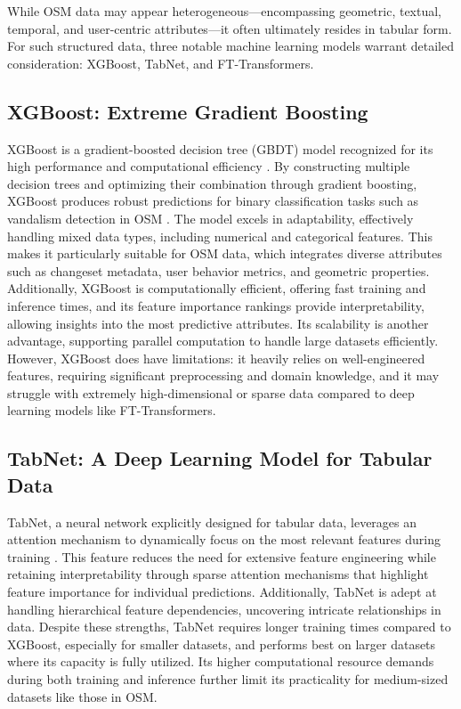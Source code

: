 \documentclass[
    13pt, %
    a4paper, %
    DIV14, %
    listof=totoc, %
    bibliography=totoc, %
    index=totoc, %
    headsepline
]{scrreprt}
\begin{document}
While OSM data may appear heterogeneous—encompassing geometric, textual, temporal, and user-centric attributes—it often ultimately resides in tabular form. For such structured data, three notable machine learning models warrant detailed consideration: XGBoost, TabNet, and FT-Transformers.

\subsection{XGBoost: Extreme Gradient Boosting}
XGBoost is a gradient-boosted decision tree (GBDT) model recognized for its high performance and computational efficiency \cite{xgboost_paper}. By constructing multiple decision trees and optimizing their combination through gradient boosting, XGBoost produces robust predictions for binary classification tasks such as vandalism detection in OSM \cite{Chen2016}. The model excels in adaptability, effectively handling mixed data types, including numerical and categorical features. This makes it particularly suitable for OSM data, which integrates diverse attributes such as changeset metadata, user behavior metrics, and geometric properties. Additionally, XGBoost is computationally efficient, offering fast training and inference times, and its feature importance rankings provide interpretability, allowing insights into the most predictive attributes. Its scalability is another advantage, supporting parallel computation to handle large datasets efficiently. However, XGBoost does have limitations: it heavily relies on well-engineered features, requiring significant preprocessing and domain knowledge, and it may struggle with extremely high-dimensional or sparse data compared to deep learning models like FT-Transformers.

\subsection{TabNet: A Deep Learning Model for Tabular Data}
TabNet, a neural network explicitly designed for tabular data, leverages an attention mechanism to dynamically focus on the most relevant features during training \cite{Arik2021}. This feature reduces the need for extensive feature engineering while retaining interpretability through sparse attention mechanisms that highlight feature importance for individual predictions. Additionally, TabNet is adept at handling hierarchical feature dependencies, uncovering intricate relationships in data. Despite these strengths, TabNet requires longer training times compared to XGBoost, especially for smaller datasets, and performs best on larger datasets where its capacity is fully utilized. Its higher computational resource demands during both training and inference further limit its practicality for medium-sized datasets like those in OSM.
\end{document}
